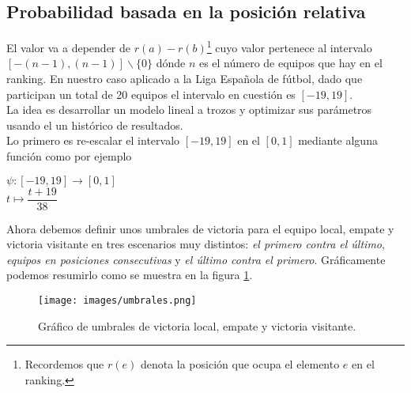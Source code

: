 \subsection*{Probabilidad basada en la posición relativa}
El valor va a depender de $r(a)-r(b)$\footnote{Recordemos que $r(e)$ denota la posición que ocupa el elemento $e$ en el ranking.} cuyo valor pertenece al intervalo $[-(n-1),(n-1)] \backslash \{0\}$ dónde $n$ es el número de equipos que hay en el ranking. En nuestro caso aplicado a la Liga Española de fútbol, dado que participan un total de 20 equipos el intervalo en cuestión es $[-19,19]$.\\
La idea es desarrollar un modelo lineal a trozos y optimizar sus parámetros usando el un histórico de resultados.\\

Lo primero es re-escalar el intervalo $[-19,19]$ en el $[0,1]$ mediante alguna función como por ejemplo
\begin{center}
	$ \psi: [-19,19] \longrightarrow [0,1]$\\
	$ t \longmapsto \dfrac{t+19}{38}$
\end{center}

Ahora debemos definir unos umbrales de victoria para el equipo local, empate y victoria visitante en tres escenarios muy distintos: \textit{el primero contra el último}, \textit{equipos en posiciones consecutivas} y \textit{el último contra el primero}. Gráficamente podemos resumirlo como se muestra en la figura \ref{fig:umbrales}.

\begin{figure}[htb]
		\centering
		\texttt{[image: images/umbrales.png]}
		\caption{Gráfico de umbrales de victoria local, empate y victoria visitante.} \label{fig:umbrales}
\end{figure}

